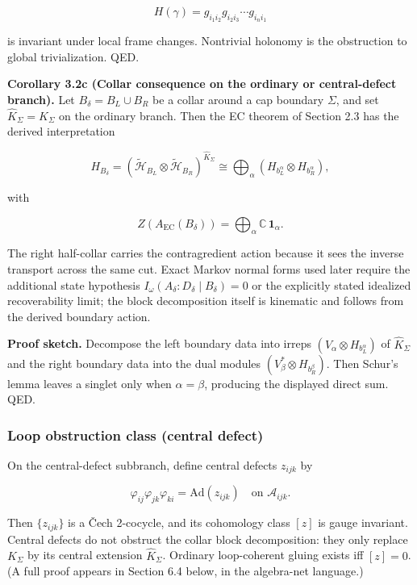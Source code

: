 \[
H(\gamma) = g_{i_1 i_2} g_{i_2 i_3} \cdots g_{i_n i_1}
\]

is invariant under local frame changes. Nontrivial holonomy is the obstruction to global trivialization. QED.

\textbf{Corollary 3.2c (Collar consequence on the ordinary or central-defect branch).} Let \(B_\delta = B_L \cup B_R\) be a collar around a cap boundary \(\Sigma\), and set \(\widehat K_\Sigma = K_\Sigma\) on the ordinary branch. Then the EC theorem of Section 2.3 has the derived interpretation

\[
H_{B_\delta}
=
(\tilde{\mathcal H}_{B_L}\otimes \tilde{\mathcal H}_{B_R})^{\widehat K_\Sigma}
\cong
\bigoplus_\alpha
(H_{b_L^\alpha}\otimes H_{b_R^\alpha}),
\]

with

\[
Z(A_{\mathrm{EC}}(B_\delta)) = \bigoplus_\alpha \mathbb C\,\mathbf 1_\alpha.
\]

The right half-collar carries the contragredient action because it sees the inverse transport across the same cut. Exact Markov normal forms used later require the additional state hypothesis \(I_\omega(A_\delta:D_\delta \mid B_\delta)=0\) or the explicitly stated idealized recoverability limit; the block decomposition itself is kinematic and follows from the derived boundary action.

\textbf{Proof sketch.} Decompose the left boundary data into irreps \((V_\alpha \otimes H_{b_L^\alpha})\) of \(\widehat K_\Sigma\) and the right boundary data into the dual modules \((V_\beta^* \otimes H_{b_R^\beta})\). Then Schur's lemma leaves a singlet only when \(\alpha=\beta\), producing the displayed direct sum. QED.

\subsubsection{Loop obstruction class (central defect)}\label{33-loop-obstruction-class-central-defect}

On the central-defect subbranch, define central defects \(z_{ijk}\) by

\[
\varphi_{ij} \varphi_{jk} \varphi_{ki} = \mathrm{Ad}(z_{ijk}) \quad \text{on } \mathcal{A}_{ijk}.
\]

Then \(\{z_{ijk}\}\) is a \v{C}ech 2-cocycle, and its cohomology class \([z]\) is gauge invariant. Central defects do not obstruct the collar block decomposition: they only replace \(K_\Sigma\) by its central extension \(\widehat K_\Sigma\). Ordinary loop-coherent gluing exists iff \([z] = 0\). (A full proof appears in Section 6.4 below, in the algebra-net language.)


